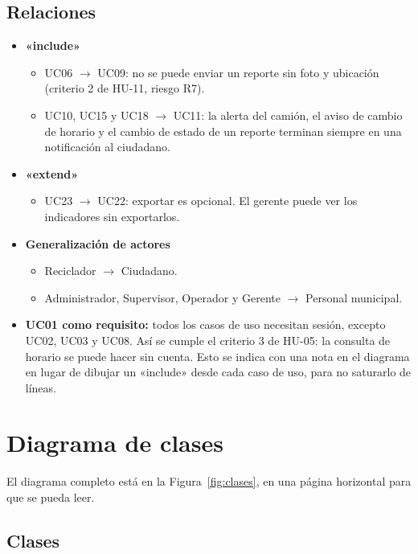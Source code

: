 \documentclass[11pt,a4paper]{article}
\begin{document}
\subsection{Relaciones}

\begin{itemize}
  \item \textbf{«include»}
  \begin{itemize}
    \item UC06 $\rightarrow$ UC09: no se puede enviar un reporte sin foto y ubicación (criterio 2 de HU-11, riesgo R7).
    \item UC10, UC15 y UC18 $\rightarrow$ UC11: la alerta del camión, el aviso de cambio de horario y el cambio de estado de un reporte terminan siempre en una notificación al ciudadano.
  \end{itemize}
  \item \textbf{«extend»}
  \begin{itemize}
    \item UC23 $\rightarrow$ UC22: exportar es opcional. El gerente puede ver los indicadores sin exportarlos.
  \end{itemize}
  \item \textbf{Generalización de actores}
  \begin{itemize}
    \item Reciclador $\rightarrow$ Ciudadano.
    \item Administrador, Supervisor, Operador y Gerente $\rightarrow$ Personal municipal.
  \end{itemize}
  \item \textbf{UC01 como requisito:} todos los casos de uso necesitan sesión, excepto UC02, UC03 y UC08. Así se cumple el criterio 3 de HU-05: la consulta de horario se puede hacer sin cuenta. Esto se indica con una nota en el diagrama en lugar de dibujar un «include» desde cada caso de uso, para no saturarlo de líneas.
\end{itemize}

\section{Diagrama de clases}

El diagrama completo está en la Figura~\ref{fig:clases}, en una página horizontal para que se pueda leer.

\subsection{Clases}
\end{document}
